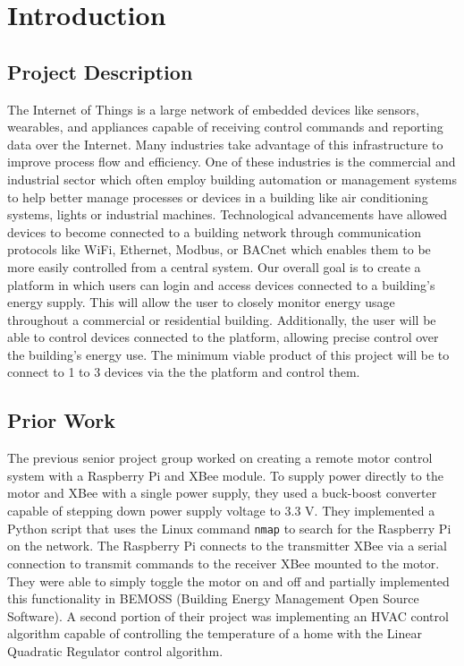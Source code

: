 \chapter{Introduction}
\label{ch: Chapter1}

\section{Project Description}
The Internet of Things is a large network of embedded devices like sensors, wearables, and appliances capable of receiving control commands and reporting data over the Internet. Many industries take advantage of this infrastructure to improve process flow and efficiency. One of these industries is the commercial and industrial sector which often employ building automation or management systems to help better manage processes or devices in a building like air conditioning systems, lights or industrial machines. Technological advancements have allowed devices to become connected to a building network through communication protocols like WiFi, Ethernet, Modbus, or BACnet which enables them to be more easily controlled from a central system.
\medbreak\noindent
Our overall goal is to create a platform in which users can login and access devices connected to a building's energy supply. This will allow the user to closely monitor energy usage throughout a commercial or residential building. Additionally, the user will be able to control devices connected to the platform, allowing precise control over the building's energy use. The minimum viable product of this project will be to connect to 1 to 3 devices via the the platform and control them.

\section{Prior Work}
The previous senior project group worked on creating a remote motor control system with a Raspberry Pi and XBee module. To supply power directly to the motor and XBee with a single power supply, they used a buck-boost converter capable of stepping down power supply voltage to 3.3 V. They implemented a Python script that uses the Linux command \texttt{nmap} to search for the Raspberry Pi on the network. The Raspberry Pi connects to the transmitter XBee via a serial connection to transmit commands to the receiver XBee mounted to the motor. They were able to simply toggle the motor on and off and partially implemented this functionality in BEMOSS (Building Energy Management Open Source Software). A second portion of their project was implementing an HVAC control algorithm capable of controlling the temperature of a home with the Linear Quadratic Regulator control algorithm.


